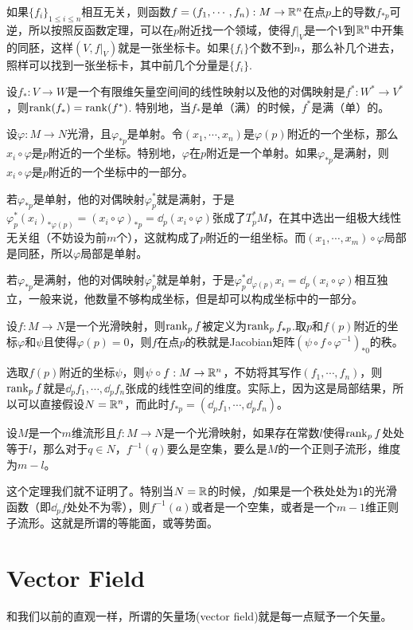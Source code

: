 如果$\{f_i\}_{1\leq i\leq n}$相互无关，则函数$f=(f_1,\cdots,f_n):M\to \mathbb{R}^n$在点$p$上的导数$f_{*p}$可逆，所以按照反函数定理，可以在$p$附近找一个领域，使得$f|_V$是一个$V$到$\mathbb{R}^n$中开集的同胚，这样$(V,f|_V)$就是一张坐标卡。如果$\{f_i\}$个数不到$n$，那么补几个进去，照样可以找到一张坐标卡，其中前几个分量是$\{f_i\}$.

\lem 设$f_*:V\to W$是一个有限维矢量空间间的线性映射以及他的对偶映射是$f^*:W^*\to V^*$，则$\operatorname{rank}(f_*)=\operatorname{rank}(f^*)$. 特别地，当$f_*$是单（满）的时候，$f^*$是满（单）的。

\para 设$\varphi:M\to N$光滑，且$\varphi_{*p}$是单射。令$(x_1,\cdots,x_n)$是$\varphi(p)$附近的一个坐标，那么$x_i\circ\varphi$是$p$附近的一个坐标。特别地，$\varphi$在$p$附近是一个单射。如果$\varphi_{*p}$是满射，则$x_i\circ\varphi$是$p$附近的一个坐标中的一部分。

若$\varphi_{*p}$是单射，他的对偶映射$\varphi^*_p$就是满射，于是$\varphi^*_p(x_i)_{*\varphi(p)}=(x_i\circ\varphi)_{*p}=\dd_p(x_i\circ \varphi)$张成了$T_p^*M$，在其中选出一组极大线性无关组（不妨设为前$m$个），这就构成了$p$附近的一组坐标。而$(x_1,\cdots,x_m)\circ \varphi$局部是同胚，所以$\varphi$局部是单射。

若$\varphi_{*p}$是满射，他的对偶映射$\varphi^*_p$就是单射，于是$\varphi^*_p\dd_{\varphi(p)}x_i=\dd_p(x_i\circ \varphi)$相互独立，一般来说，他数量不够构成坐标，但是却可以构成坐标中的一部分。

\para 设$f:M\to N$是一个光滑映射，则$\operatorname{rank}_p f$被定义为$\operatorname{rank}_p f_{*p}$.取$p$和$f(p)$附近的坐标$\varphi$和$\psi$且使得$\varphi(p)=0$，则$f$在点$p$的秩就是Jacobian矩阵$(\psi\circ f \circ \varphi^{-1})_{*0}$的秩。

选取$f(p)$附近的坐标$\psi$，则$\psi\circ f:M\to \mathbb{R}^n$，不妨将其写作$(f_1,\cdots,f_n)$，则$\operatorname{rank}_p f$就是${\dd_pf_1,\cdots,\dd_pf_n}$张成的线性空间的维度。实际上，因为这是局部结果，所以可以直接假设$N=\mathbb{R}^n$，而此时$f_{*p}=(\dd_pf_1,\cdots,\dd_pf_n)$。

\theo 设$M$是一个$m$维流形且$f:M\to N$是一个光滑映射，如果存在常数$l$使得$\operatorname{rank}_p f$处处等于$l$，那么对于$q\in N$，$f^{-1}(q)$要么是空集，要么是$M$的一个正则子流形，维度为$m-l$。

这个定理我们就不证明了。特别当$N=\mathbb{R}$的时候，$f$如果是一个秩处处为$1$的光滑函数（即$\dd_p f$处处不为零），则$f^{-1}(a)$或者是一个空集，或者是一个$m-1$维正则子流形。这就是所谓的等能面，或等势面。

\section{Vector Field}
和我们以前的直观一样，所谓的矢量场(vector field)就是每一点赋予一个矢量。

